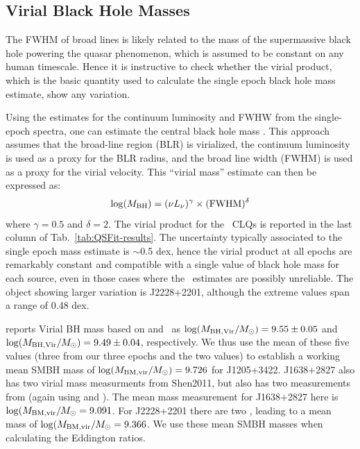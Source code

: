 \documentclass[fleqn,usenatbib]{mnras}
\begin{document}
\subsection{Virial Black Hole Masses}\label{sec:BH_masses} 
The FWHM of broad lines is likely related to the mass of the
supermassive black hole powering the quasar phenomenon, which is
assumed to be constant on any human timescale.  Hence it is
instructive to check whether the virial product, which is the basic
quantity used to calculate the single epoch black hole mass estimate,
show any variation.

Using the estimates for the continuum luminosity and FWHW from the
single-epoch spectra, one can estimate the central black hole mass
\citep[e.g.][]{Shen2011, Calderone2017}.  This approach assumes that
the broad-line region (BLR) is virialized, the continuum luminosity is
used as a proxy for the BLR radius, and the broad line width (FWHM) is
used as a proxy for the virial velocity.  This ``virial mass''
estimate can then be expressed as:
\begin{equation}
  \log(M_{\rm BH}) = (\nu L_{\nu})^{\gamma} \times ({\rm FWHM})^{\delta}
\end{equation}
where $\gamma=0.5$ and $\delta=2$.  The virial product for the \civ\
CLQs is reported in the last column of Tab.~\ref{tab:QSFit-results}. 
The uncertainty typically associated to the single epoch mass estimate
is $\sim$0.5 dex, hence the virial product at all epochs are
remarkably constant and compatible with a single value of black hole
mass for each source, even in those cases where the \civ\ estimates
are possibly unreliable. The object showing larger variation is
J2228+2201, although the extreme values span a range of 0.48 dex.

\citet{Shen2011} reports Virial BH mass based on \mgii and \civ\ as
$\log (M_{\rm BH, Vir}/M_{\odot}) = 9.55\pm0.05$ and $\log(M_{\rm BH, Vir}/M_{\odot}) =
9.49\pm0.04$, respectively. We thus use the mean of these five values
(three from our three epochs and the two \citet{Shen2011} values) to
establish a working mean SMBH mass of $\log (M_{\rm BM, vir}/M_{\odot})
= 9.726$ for J1205+3422.  J1638+2827 also has two virial mass
measurments from Shen2011, but also has two measurements from
\citet{Kozlowski2017} (again using \civ and \mgii). The mean mass
measurement for J1638+2827 here is $\log(M_{\rm BM, vir}/M_{\odot} =
9.091$. For J2228+2201 there are two \citet{Kozlowski2017}, leading to
a mean mass of $\log(M_{\rm BM, vir}/M_{\odot} = 9.366$. We use these
mean SMBH masses when calculating the Eddington ratios.
\end{document}
